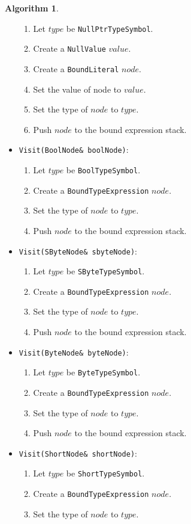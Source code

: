 \documentclass[a4paper,oneside,11pt]{book}
\theoremstyle{definition}
\newtheorem{algo}{Algorithm}[section]
\begin{document}
\begin{algo}
\begin{itemize}
\begin{enumerate}
\item
Let $type$ be \verb|NullPtrTypeSymbol|.
\item
Create a \verb|NullValue| $value$.
\item
Create a \verb|BoundLiteral| $node$.
\item
Set the value of node to $value$.
\item
Set the type of $node$ to $type$.
\item
Push $node$ to the bound expression stack.
\end{enumerate}
\item
\verb|Visit(BoolNode& boolNode)|:
\begin{enumerate}
\item
Let $type$ be \verb|BoolTypeSymbol|.
\item
Create a \verb|BoundTypeExpression| $node$.
\item
Set the type of $node$ to $type$.
\item
Push $node$ to the bound expression stack.
\end{enumerate}
\item
\verb|Visit(SByteNode& sbyteNode)|:
\begin{enumerate}
\item
Let $type$ be \verb|SByteTypeSymbol|.
\item
Create a \verb|BoundTypeExpression| $node$.
\item
Set the type of $node$ to $type$.
\item
Push $node$ to the bound expression stack.
\end{enumerate}
\item
\verb|Visit(ByteNode& byteNode)|:
\begin{enumerate}
\item
Let $type$ be \verb|ByteTypeSymbol|.
\item
Create a \verb|BoundTypeExpression| $node$.
\item
Set the type of $node$ to $type$.
\item
Push $node$ to the bound expression stack.
\end{enumerate}
\item
\verb|Visit(ShortNode& shortNode)|:
\begin{enumerate}
\item
Let $type$ be \verb|ShortTypeSymbol|.
\item
Create a \verb|BoundTypeExpression| $node$.
\item
Set the type of $node$ to $type$.

\end{enumerate}
\end{itemize}
\end{algo}
\end{document}
